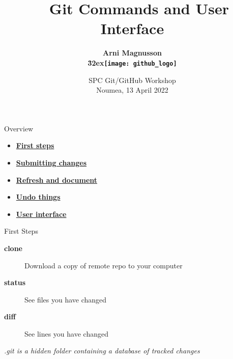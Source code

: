\documentclass[aspectratio=169]{beamer}
\begin{document}
\begin{frame}
  \title{ ~ Git Commands and User Interface}
  \author{\darkgray\bf Arni Magnusson\\
    \phantom{.}\h{32ex}\texttt{[image: github\_logo]}}
  \date{\darkgreen SPC Git/GitHub Workshop\\[0.5ex]
    Noumea, 13 April 2022}
  \titlepage
\end{frame}


\begin{frame}{Overview}
  \begin{itemize}
    \item[] \hyperlink{first}{\bf\darkblue First steps}
    \\[4ex]
    \item[] \hyperlink{submit}{\bf\darkblue Submitting changes} \\[4ex]
    \item[] \hyperlink{refresh}{\bf\darkblue Refresh and document}
    \\[4ex]
    \item[] \hyperlink{undo}{\bf\darkblue Undo things} \\[4ex]
    \item[] \hyperlink{ui}{\bf\darkblue User interface}
    \\[1ex]
  \end{itemize}
\end{frame}



\begin{frame}{First Steps}\small
  \vspace{4ex}
  \begin{description}
    \item[\bf clone] Download a copy of remote repo to your computer\\[6ex]
    \item[\bf status] See files you have changed\\[6ex]
    \item[\bf diff] See lines you have changed\\[10ex]
  \end{description}
  \darkblue\it\fns .git is a hidden folder containing a database of tracked
  changes
\end{frame}
\end{document}
